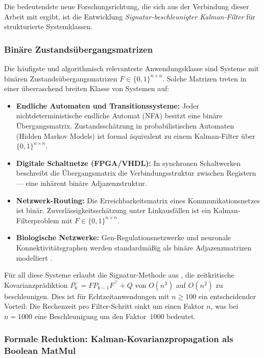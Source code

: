 ﻿\documentclass[a4paper,12pt]{article}
\theoremstyle{definition}
\begin{document}
Die bedeutendste neue Forschungsrichtung, die sich aus der Verbindung dieser Arbeit
mit \cite{epp2026boolmm} ergibt, ist die Entwicklung \emph{Signatur-beschleunigter
Kalman-Filter} für strukturierte Systemklassen.

\subsubsection{Binäre Zustandsübergangsmatrizen}

Die häufigste und algorithmisch relevanteste Anwendungsklasse sind Systeme mit
binären Zustandsübergangsmatrizen $F \in \{0,1\}^{n\times n}$. Solche Matrizen
treten in einer überraschend breiten Klasse von Systemen auf:
\begin{itemize}
    \item \textbf{Endliche Automaten und Transitionssysteme:} Jeder nichtdeterministische
          endliche Automat (NFA) besitzt eine binäre Übergangsmatrix. Zustandsschätzung
          in probabilistischen Automaten (Hidden Markov Models) ist formal äquivalent
          zu einem Kalman-Filter über $\{0,1\}^{n\times n}$.
    \item \textbf{Digitale Schaltnetze (FPGA/VHDL):} In synchronen Schaltwerken
          beschreibt die Übergangsmatrix die Verbindungsstruktur zwischen Registern ---
          eine inhärent binäre Adjazenzstruktur.
    \item \textbf{Netzwerk-Routing:} Die Erreichbarkeitsmatrix eines Kommunikationsnetzes
          ist binär. Zuverlässigkeitsschätzung unter Linkausfällen ist ein
          Kalman-Filterproblem mit $F \in \{0,1\}^{n\times n}$.
    \item \textbf{Biologische Netzwerke:} Gen-Regulationsnetzwerke und neuronale
          Konnektivitätsgraphen werden standardmäßig als binäre Adjazenzmatrizen
          modelliert \cite{epp2026bio}.
\end{itemize}

Für all diese Systeme erlaubt die Signatur-Methode aus \cite{epp2026boolmm}, die
zeitkritische Kovarianzprädiktion $P_k^- = F P_{k-1} F^\top + Q$ von $O(n^3)$
auf $O(n^2)$ zu beschleunigen. Dies ist für Echtzeitanwendungen mit $n \geq 100$
ein entscheidender Vorteil: Die Rechenzeit pro Filter-Schritt sinkt um einen Faktor $n$,
was bei $n = 1000$ eine Beschleunigung um den Faktor~$1000$ bedeutet.

\subsubsection{Formale Reduktion: Kalman-Kovarianzpropagation als Boolean MatMul}
\end{document}
